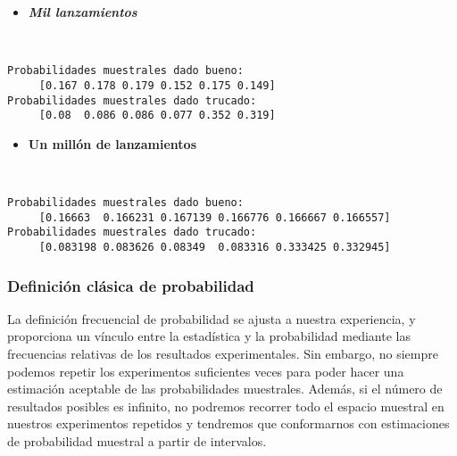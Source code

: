 \documentclass[11pt]{article}
\providecommand{\tightlist}{%
      \setlength{\itemsep}{0pt}\setlength{\parskip}{0pt}}
\begin{document}
    \begin{itemize}
\tightlist
\item
  \textbf{\emph{Mil lanzamientos}}
\end{itemize}

    \begin{center}
    \end{center}
    { \hspace*{\fill} \\}
    
    \begin{Verbatim}[commandchars=\\\{\}]
Probabilidades muestrales dado bueno: 
	 [0.167 0.178 0.179 0.152 0.175 0.149]
Probabilidades muestrales dado trucado:
	 [0.08  0.086 0.086 0.077 0.352 0.319]

    \end{Verbatim}

    \begin{itemize}
\tightlist
\item
  \textbf{Un millón de lanzamientos}
\end{itemize}

    \begin{center}
    \end{center}
    { \hspace*{\fill} \\}
    
    \begin{Verbatim}[commandchars=\\\{\}]
Probabilidades muestrales dado bueno: 
	 [0.16663  0.166231 0.167139 0.166776 0.166667 0.166557]
Probabilidades muestrales dado trucado:
	 [0.083198 0.083626 0.08349  0.083316 0.333425 0.332945]

    \end{Verbatim}

    \subsubsection*{Definición clásica de
probabilidad}\label{definiciuxf3n-cluxe1sica-probabilidad}

La definición frecuencial de probabilidad se ajusta a nuestra
experiencia, y proporciona un vínculo entre la estadística y la
probabilidad mediante las frecuencias relativas de los resultados
experimentales. Sin embargo, no siempre podemos repetir los experimentos
suficientes veces para poder hacer una estimación aceptable de las
probabilidades muestrales. Además, si el número de resultados posibles
es infinito, no podremos recorrer todo el espacio muestral en nuestros
experimentos repetidos y tendremos que conformarnos con estimaciones de
probabilidad muestral a partir de intervalos.
\end{document}
